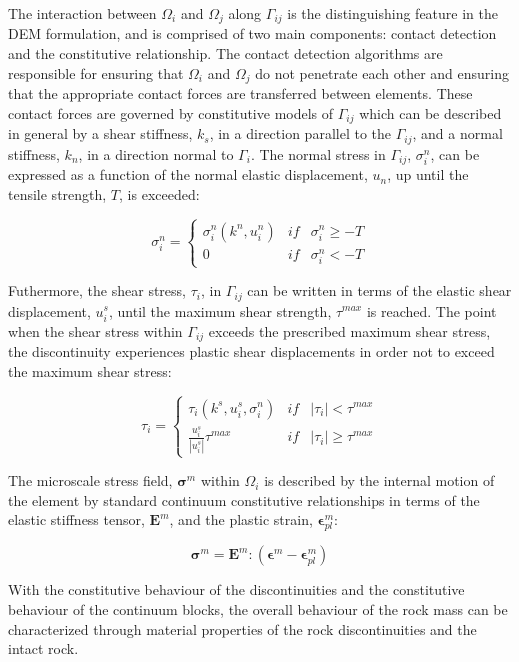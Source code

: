 
The interaction between $\Omega_i$ and $\Omega_j$ along $\Gamma_{ij}$ is the distinguishing feature in the DEM formulation, and is comprised of two main components: contact detection and the constitutive relationship. The contact detection algorithms are responsible for ensuring that $\Omega_i$ and $\Omega_j$ do not penetrate each other and ensuring that the appropriate contact forces are transferred between elements. These contact forces are governed by constitutive models of $\Gamma_{ij}$ which can be described in general by a shear stiffness, $k_s$, in a direction parallel to the $\Gamma_{ij}$, and a normal stiffness, $k_n$, in a direction normal to $\Gamma_i$. The normal stress in $\Gamma_{ij}$, $\sigma_i^n$, can be expressed as a function of the normal elastic displacement, $u_n$, up until the tensile strength, $T$, is exceeded: 

\begin{equation}
\sigma^n_i=\left\{\begin{matrix}
\sigma^n_i\left(k^n, u_i^n\right) &if& \sigma^n_i \geq -T\\ 
 0 & if &\sigma^n_i < -T
\end{matrix}\right.
\label{eqn:demnormal}
\end{equation}

Futhermore, the shear stress, $\tau_i$, in $\Gamma_{ij}$ can be written in terms of the elastic shear displacement, $u_i^s$, until the maximum shear strength, $\tau^{max}$ is reached. The point when the shear stress within $\Gamma_{ij}$ exceeds the prescribed maximum shear stress, the discontinuity experiences plastic shear displacements in order not to exceed the maximum shear stress:

\begin{equation}
\tau_i=\left\{\begin{matrix}
\tau_i\left(k^s,u_i^s, \sigma_i^n\right) &if&\left |\tau_i \right | < \tau^{max}\\ 
\frac{u_i^s}{\left|u_i^s\right|}\tau^{max} & if &\left |\tau_i \right | \geq \tau^{max}
\end{matrix}\right.
\label{eqn:demshear}
\end{equation}

The microscale stress field, $\boldsymbol{\sigma}^m$ within $\Omega_i$ is described by the internal motion of the element by standard continuum constitutive relationships in terms of the elastic stiffness tensor, $\mathbf{E}^m$, and the plastic strain, $\boldsymbol{\epsilon}^m_{pl}$:  

\begin{equation}
\boldsymbol{\sigma}^m =\mathbf{E}^m:\left(\boldsymbol{\epsilon}^m - \boldsymbol{\epsilon}^m_{pl}\right)
\label{eqn:demcont}
\end{equation}

With the constitutive behaviour of the discontinuities and the constitutive behaviour of the continuum blocks, the overall behaviour of the rock mass can be characterized through material properties of the rock discontinuities and the intact rock.